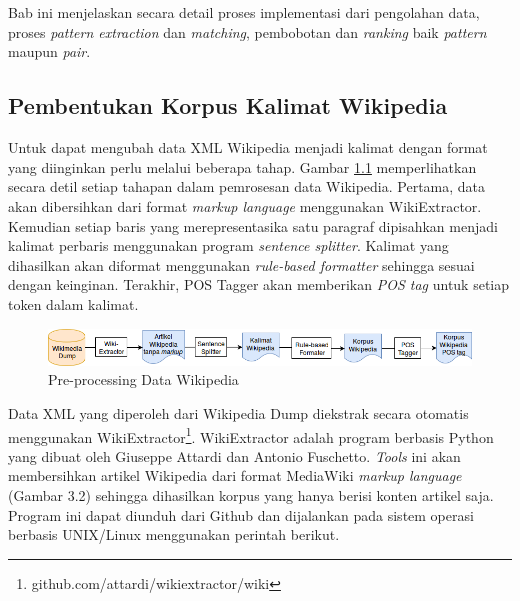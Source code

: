 \chapter{\babEmpat}
Bab ini menjelaskan secara detail proses implementasi dari pengolahan data, proses \textit{pattern extraction} dan \textit{matching}, pembobotan dan \textit{ranking} baik \textit{pattern} maupun \textit{pair}.

%
\section{Pembentukan Korpus Kalimat Wikipedia}
Untuk dapat mengubah data XML Wikipedia menjadi kalimat dengan format yang diinginkan perlu melalui beberapa tahap. Gambar \ref{fig:preproses-wiki} memperlihatkan secara detil setiap tahapan dalam pemrosesan data Wikipedia. Pertama, data akan dibersihkan dari format \textit{markup language} menggunakan WikiExtractor. Kemudian setiap baris yang merepresentasika satu paragraf dipisahkan menjadi kalimat perbaris menggunakan program \textit{sentence splitter}. Kalimat yang dihasilkan akan diformat menggunakan \textit{rule-based formatter} sehingga sesuai dengan keinginan. Terakhir, POS Tagger akan memberikan \textit{POS tag} untuk setiap token dalam kalimat.

\begin{figure}
    \centering
    \includegraphics[width=\linewidth]{pics/Pic02-PreProcessingWikipedia}
    \caption{Pre-processing Data Wikipedia}
    \label{fig:preproses-wiki}
\end{figure}

Data XML yang diperoleh dari Wikipedia Dump diekstrak secara otomatis menggunakan WikiExtractor\footnote{github.com/attardi/wikiextractor/wiki}. WikiExtractor adalah program berbasis Python yang dibuat oleh Giuseppe Attardi dan Antonio Fuschetto. \textit{Tools} ini akan membersihkan artikel Wikipedia dari format MediaWiki \textit{markup language} (Gambar 3.2) sehingga dihasilkan korpus yang hanya berisi konten artikel saja. Program ini dapat diunduh dari Github dan dijalankan pada sistem operasi berbasis UNIX/Linux menggunakan perintah berikut. 

